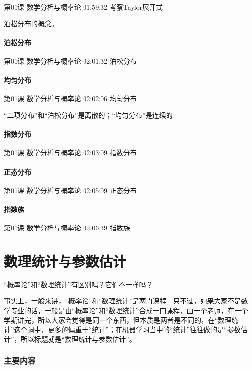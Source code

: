 \documentclass[UTF8]{ctexbook}
\begin{document}
第01课 数学分析与概率论 01:59:32 考察Taylor展开式

泊松分布的概念。

\subsubsection{泊松分布}

第01课 数学分析与概率论 02:01:32 泊松分布



\subsubsection{均匀分布}

第01课 数学分析与概率论 02:02:06 均匀分布

“二项分布”和“泊松分布”是离散的；“均匀分布”是连续的

\subsubsection{指数分布}

第01课 数学分析与概率论 02:03:09 指数分布

\subsubsection{正态分布}

第01课 数学分析与概率论 02:05:09 正态分布

\subsubsection{指数族}

第01课 数学分析与概率论 02:06:39 指数族

\chapter{数理统计与参数估计}

“概率论”和“数理统计”有区别吗？它们不一样吗？

事实上，一般来讲，“概率论”和“数理统计”是两门课程，只不过，如果大家不是数学专业的话，一般是由“概率论”和“数理统计”合成一门课程，由一个老师，在一个学期讲完，所以大家会觉得是同一个东西，但本质是两者是不同的。在“数理统计”这个词中，更多的偏重于“统计”；在机器学习当中的“统计”往往做的是“参数估计”，所以标题就是“数理统计与参数估计”。

\subsection{主要内容}
\end{document}
